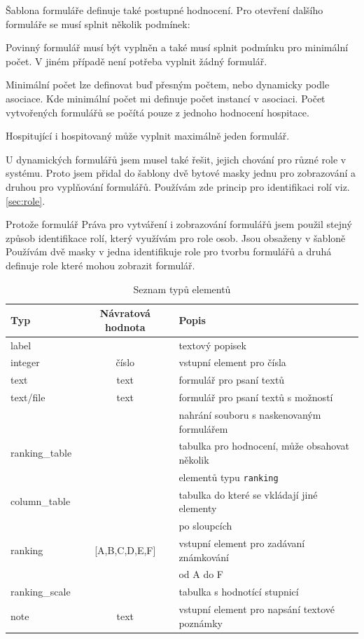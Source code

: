 Šablona formuláře definuje také postupné hodnocení. Pro otevření dalšího formuláře se musí splnit několik podmínek:

\begin{list}{}{}
\item Povinný formulář musí být vyplněn a také musí splnit podmínku pro minimální počet. V jiném případě není potřeba vyplnit žádný formulář.
\item Minimální počet lze definovat buď přesným počtem, nebo dynamicky podle asociace. Kde minimální počet mi definuje počet instancí v asociaci. Počet vytvořených formulářů se počítá pouze z jednoho hodnocení hospitace.
\item Hospitující i hospitovaný může vyplnit maximálně jeden formulář.
\end{list}

U dynamických formulářů jsem musel také řešit, jejich chování pro různé role v systému. Proto jsem přidal do šablony dvě bytové masky jednu pro zobrazování a druhou pro vyplňování formulářů. Používám zde princip pro identifikaci rolí viz. \ref{sec:role}.

Protože formulář Práva pro vytváření i zobrazování formulářů jsem použil stejný způsob identifikace rolí, který využívám pro role osob. Jsou obsaženy v šabloně Používám dvě masky v  jedna  identifikuje role pro tvorbu formulářů a druhá definuje role které mohou zobrazit formulář.


\begin{table}[h]
\begin{center}
\begin{tabular}{|l|c|l|}

\hline
\textbf{Typ} & \textbf{Návratová hodnota} & \textbf{Popis} \\ \hline
label &  & textový popisek \\\hline
integer & číslo & vstupní element pro čísla \\ \hline
text & text & formulář pro psaní textů \\\hline
text/file & text & formulář pro psaní textů s možností \\ & &  nahrání souboru s naskenovaným formulářem \\\hline
ranking\_table &  & tabulka pro hodnocení, může obsahovat několik \\ & & elementů typu \verb|ranking| \\\hline
column\_table & & tabulka do které se vkládají jiné elementy \\ & &  po sloupcích \\\hline
ranking & [A,B,C,D,E,F] & vstupní element pro zadávaní známkování  \\ & &   od A do F \\\hline
ranking\_scale & & tabulka s hodnotící stupnicí \\\hline
note & text & vstupní element pro napsání textové poznámky \\\hline

\end{tabular}
\caption{Seznam typů elementů}
\label{tab:elements}
\end{center}
\end{table}

